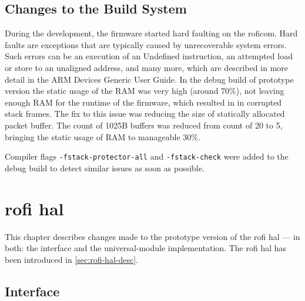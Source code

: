 \documentclass[
  digital,     %
  oneside,     %
  nosansbold,  %
  nocolorbold, %
  nolof,         %
  nolot,         %
]{fithesis4}
\newcommand{\TODO}[1]{\textcolor{red}{\textit{#1}}}
\newcommand{\TODOLIST}[1]{}
\begin{document}
{{{\section{ Changes to the Build System }
\TODOLIST{
\begin{itemize}
    \item static buffer vs ram
    \item Hard fault = ram had too high static usage, minimizing the usage by lower the number of available buckets for packets solved this (memory::pool)
\end{itemize}
}

During the development, the firmware started hard faulting on the \acrshort{roficom}. Hard faults are exceptions that are typically caused by unrecoverable system errors. Such errors can be an execution of an Undefined instruction, an attempted load or store to an unaligned address, and many more, which are described in more detail in the ARM Devices Generic User Guide. In the debug build of prototype version the static usage of the RAM was very high (around $70\%$), not leaving enough RAM for the runtime of the firmware, which resulted in in corrupted stack frames. The fix to this issue was reducing the size of statically allocated packet buffer. The count of 1025B buffers was reduced from count of 20 to 5, bringing the static usage of RAM to manageable $30\%$.

Compiler flags \lstinline|-fstack-protector-all| and \lstinline|-fstack-check| were added to the debug build to detect similar issues as soon as possible.

\chapter[ RoFI Hardware Abstraction Layer ]{ \acrshort{rofi} \acrlong{hal} } \label{ch:rofi-hal}

This chapter describes changes made to the prototype version of the \acrshort{rofi} \acrshort{hal} --- in both: the interface and the \gls{universal-module} implementation. The \acrshort{rofi} \acrshort{hal} has been introduced in \autoref{sec:rofi-hal-desc}.

\section{Interface} \label{sec:rofi-hal-interface}

\TODOLIST{
\begin{itemize}
    \item Current interface components - RoFI, joint, connector
    \item \textbf{Proxy} 
    \item Changes done --- Added distance and status
\end{itemize}
}

}}}
\end{document}
